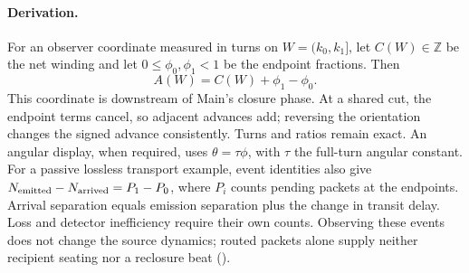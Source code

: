 \paragraph{Derivation.}
For an observer coordinate measured in turns on \(W=(k_0,k_1]\), let
\(C(W)\in\mathbb Z\) be the net winding and let
\(0\leq\phi_0,\phi_1<1\) be the endpoint fractions. Then
\begin{equation}
 A(W)=C(W)+\phi_1-\phi_0.
 \label{eq:manual-m3-observed-advance}
\end{equation}
This coordinate is downstream of Main's closure phase.
At a shared cut, the endpoint terms cancel, so adjacent advances add;
reversing the orientation changes the signed advance consistently.
Turns and ratios remain exact. An angular display, when required, uses
\(\theta=\tau\phi\), with \(\tau\) the full-turn angular constant.
For a passive lossless transport example, event identities also give
\(N_{\rm emitted}-N_{\rm arrived}=P_1-P_0\), where \(P_i\) counts pending
packets at the endpoints. Arrival separation equals emission separation plus
the change in transit delay. Loss and detector inefficiency require their own
counts. Observing these events does not change the source dynamics; routed
packets alone supply neither recipient seating nor a reclosure beat
().

